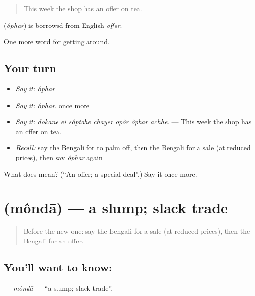 \begin{quote}
This week the shop has an offer on tea.
\end{quote}

\begin{cousinweb}
\textbf{} (\emph{ôphār}) is borrowed from English \emph{offer}.
\end{cousinweb}

\begin{grammarlens}[title={What you've built}]
One more word for getting around.
\end{grammarlens}

\subsection*{Your turn}
\begin{itemize}
\raggedright
  \item \emph{Say it:} \emph{ôphār}
  \item \emph{Say it:} \emph{ôphār}, once more
  \item \emph{Say it:} \emph{dokāne ei sôptāhe chāyer opôr ôphār āchhe.} — This week the shop has an offer on tea.
  \item \emph{Recall:} say the Bengali for to palm off, then the Bengali for a sale (at reduced prices), then say \emph{ôphār} again
\end{itemize}

\begin{tcolorbox}[breakable,colback=teal!4,colframe=teal!35!black,title={Before you move on}]
What does  mean? (\textquotedblleft{}An offer; a special deal\textquotedblright{}.) Say it once more.
\end{tcolorbox}
\section[\texorpdfstring{\bn{মন্দা} (môndā)}{মন্দা (môndā)}]{ (môndā) — a slump; slack trade}

\label{lesson:BN-C424-monda}



\begin{quote}
Before the new one: say the Bengali for a sale (at reduced prices), then the Bengali for an offer.
\end{quote}

\subsection*{You'll want to know: }
\textbf{} — \emph{môndā} — \textquotedblleft{}a slump; slack trade\textquotedblright{}.

